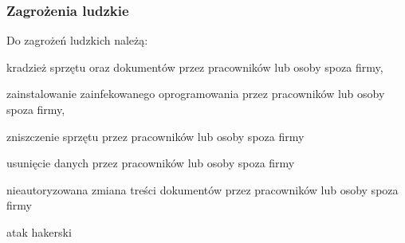 \subsubsection{Zagrożenia ludzkie}
Do zagrożeń ludzkich należą: 
\begin{itemize*}
	\item kradzież sprzętu oraz dokumentów przez pracowników lub osoby spoza firmy,
	\item zainstalowanie zainfekowanego oprogramowania przez pracowników lub osoby spoza firmy,
	\item zniszczenie sprzętu przez pracowników lub osoby spoza firmy
	\item usunięcie danych przez pracowników lub osoby spoza firmy
	\item nieautoryzowana zmiana treści dokumentów przez pracowników lub osoby spoza firmy
	\item atak hakerski 
\end{itemize*}


